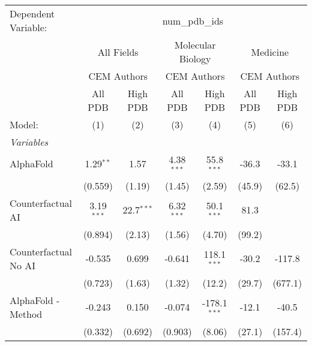 \begingroup
\centering
\begin{tabular}{lcccccc}
   \tabularnewline \midrule \midrule
   Dependent Variable: & \multicolumn{6}{c}{num\_pdb\_ids}\\
 & \multicolumn{2}{c}{All Fields} & \multicolumn{2}{c}{Molecular Biology} & \multicolumn{2}{c}{Medicine} \\
\cmidrule(lr){2-3} \cmidrule(lr){4-5} \cmidrule(lr){6-7}
 & \multicolumn{2}{c}{CEM Authors} & \multicolumn{2}{c}{CEM Authors} & \multicolumn{2}{c}{CEM Authors} \\
\cmidrule(lr){2-3} \cmidrule(lr){4-5} \cmidrule(lr){6-7}
 & \multicolumn{1}{c}{All PDB} & \multicolumn{1}{c}{High PDB} & \multicolumn{1}{c}{All PDB} & \multicolumn{1}{c}{High PDB} & \multicolumn{1}{c}{All PDB} & \multicolumn{1}{c}{High PDB} \\
\cmidrule(lr){2-2} \cmidrule(lr){3-3} \cmidrule(lr){4-4} \cmidrule(lr){5-5} \cmidrule(lr){6-6} \cmidrule(lr){7-7}
   Model:                                                     & (1)          & (2)           & (3)          & (4)            & (5)          & (6)\\  
   \midrule
   \emph{Variables}\\
   AlphaFold                                                  & 1.29$^{**}$  & 1.57          & 4.38$^{***}$ & 55.8$^{***}$   & -36.3        & -33.1\\   
                                                              & (0.559)      & (1.19)        & (1.45)       & (2.59)         & (45.9)       & (62.5)\\   
   Counterfactual AI                                          & 3.19$^{***}$ & 22.7$^{***}$  & 6.32$^{***}$ & 50.1$^{***}$   & 81.3         &   \\   
                                                              & (0.894)      & (2.13)        & (1.56)       & (4.70)         & (99.2)       &   \\   
   Counterfactual No AI                                       & -0.535       & 0.699         & -0.641       & 118.1$^{***}$  & -30.2        & -117.8\\   
                                                              & (0.723)      & (1.63)        & (1.32)       & (12.2)         & (29.7)       & (677.1)\\   
   AlphaFold - Method                                         & -0.243       & 0.150         & -0.074       & -178.1$^{***}$ & -12.1        & -40.5\\   
                                                              & (0.332)      & (0.692)       & (0.903)      & (8.06)         & (27.1)       & (157.4)\\   

\end{tabular}
